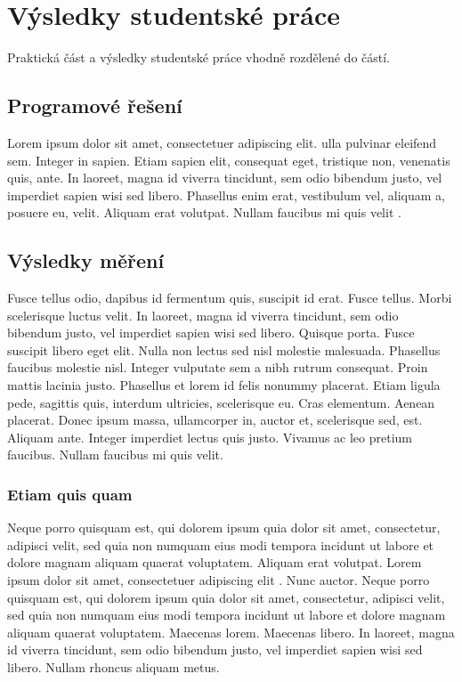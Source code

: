 \chapter{Výsledky studentské práce}

Praktická část a výsledky studentské práce vhodně rozdělené do částí.

\section{Programové řešení}
Lorem ipsum dolor sit amet, consectetuer adipiscing elit. 
ulla pulvinar eleifend sem. 
Integer in sapien. 
Etiam sapien elit, consequat eget, tristique non, venenatis quis, ante. 
In laoreet, magna id viverra tincidunt, sem odio bibendum justo, vel imperdiet sapien wisi sed libero. 
Phasellus enim erat, vestibulum vel, aliquam a, posuere eu, velit. 
Aliquam erat volutpat. 
Nullam faucibus mi quis velit \cite{sr72/2017}.

\section{Výsledky měření}
Fusce tellus odio, dapibus id fermentum quis, suscipit id erat. 
Fusce tellus. 
Morbi scelerisque luctus velit. 
In laoreet, magna id viverra tincidunt, sem odio bibendum justo, vel imperdiet sapien wisi sed libero. 
Quisque porta. 
Fusce suscipit libero eget elit. 
Nulla non lectus sed nisl molestie malesuada. 
Phasellus faucibus molestie nisl. 
Integer vulputate sem a nibh rutrum consequat. 
Proin mattis lacinia justo. 
Phasellus et lorem id felis nonummy placerat. 
Etiam ligula pede, sagittis quis, interdum ultricies, scelerisque eu. 
Cras elementum. 
Aenean placerat. 
Donec ipsum massa, ullamcorper in, auctor et, scelerisque sed, est. 
Aliquam ante. 
Integer imperdiet lectus quis justo. 
Vivamus ac leo pretium faucibus. 
Nullam faucibus mi quis velit.

\subsection{Etiam quis quam}
Neque porro quisquam est, qui dolorem ipsum quia dolor sit amet, consectetur, adipisci velit, sed quia non numquam eius modi tempora incidunt ut labore et dolore magnam aliquam quaerat voluptatem. 
Aliquam erat volutpat. 
Lorem ipsum dolor sit amet, consectetuer adipiscing elit \cite{sr72/2017,pravidla}. 
Nunc auctor. 
Neque porro quisquam est, qui dolorem ipsum quia dolor sit amet, consectetur, adipisci velit, sed quia non numquam eius modi tempora incidunt ut labore et dolore magnam aliquam quaerat voluptatem. 
Maecenas lorem. 
Maecenas libero. 
In laoreet, magna id viverra tincidunt, sem odio bibendum justo, vel imperdiet sapien wisi sed libero. 
Nullam rhoncus aliquam metus.

